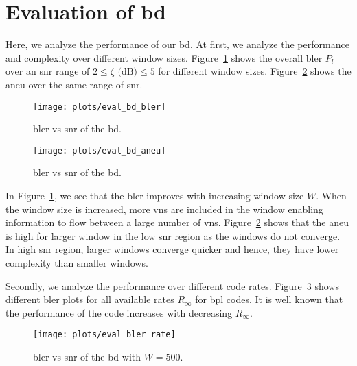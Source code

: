 \section{Evaluation of \acrlong{bd}}
Here, we analyze the performance of our \gls{bd}. At first, we analyze the performance and complexity over different window sizes. Figure~\ref{fig:eval_bd_bler} shows the overall \gls{bler} $P_l$ over an \gls{snr} range of $2\leq\zeta\text{ (dB)}\leq 5$ for different window sizes. Figure~\ref{fig:eval_bd_aneu} shows the \gls{aneu} over the same range of \gls{snr}.
\begin{figure}[htbp]
  \centering
  \texttt{[image: plots/eval\_bd\_bler]}
  \caption{\gls{bler} vs \gls{snr} of the \acrfull{bd}.}
  \label{fig:eval_bd_bler}
\end{figure}
\begin{figure}[htbp]
   \centering
  \texttt{[image: plots/eval\_bd\_aneu]}
  \caption{\gls{bler} vs \gls{snr} of the \acrfull{bd}.}
  \label{fig:eval_bd_aneu}
\end{figure}

In Figure~\ref{fig:eval_bd_bler}, we see that the \gls{bler} improves with increasing window size $W$. When the window size is increased, more \glspl{vn} are included in the window enabling information to flow between a large number of \glspl{vn}. Figure~\ref{fig:eval_bd_aneu} shows that the \gls{aneu} is high for larger window in the low \gls{snr} region as the windows do not converge. In high \gls{snr} region, larger windows converge quicker and hence, they have lower complexity than smaller windows.

Secondly, we analyze the performance over different code rates. Figure~\ref{fig:eval_bler_rate} shows different \gls{bler} plots for all available rates $R_\infty$ for \gls{bpl} codes. It is well known that the performance of the code increases with decreasing $R_\infty$.
\begin{figure}[htbp]
  \centering
  \texttt{[image: plots/eval\_bler\_rate]}
  \caption{\gls{bler} vs \gls{snr} of the \acrfull{bd} with $W=500$.}
  \label{fig:eval_bler_rate}
\end{figure}

